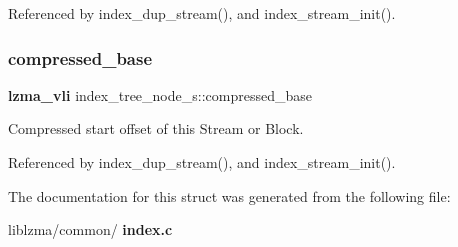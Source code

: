 Referenced by index\+\_\+dup\+\_\+stream(), and index\+\_\+stream\+\_\+init().

\mbox{\label{structindex__tree__node__s_a9d6408ee6c8682141d1ebff3ec17865d}} 
\subsubsection{compressed\+\_\+base}
{\footnotesize\ttfamily \textbf{ lzma\+\_\+vli} index\+\_\+tree\+\_\+node\+\_\+s\+::compressed\+\_\+base}



Compressed start offset of this Stream or Block. 



Referenced by index\+\_\+dup\+\_\+stream(), and index\+\_\+stream\+\_\+init().



The documentation for this struct was generated from the following file\+:\begin{DoxyCompactItemize}
\item 
liblzma/common/\textbf{ index.\+c}\end{DoxyCompactItemize}
